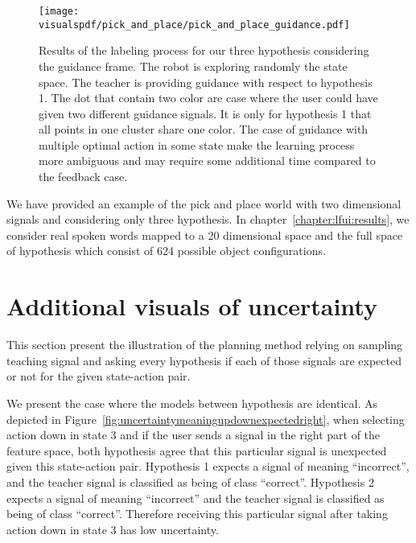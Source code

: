 \begin{figure}[!ht]
  \centering
  \texttt{[image: \\visualspdf/pick\_and\_place/pick\_and\_place\_guidance.pdf]}
  \caption{Results of the labeling process for our three hypothesis considering the guidance frame. The robot is exploring randomly the state space. The teacher is providing guidance with respect to hypothesis 1. The dot that contain two color are case where the user could have given two different guidance signals. It is only for hypothesis 1 that all points in one cluster share one color. The case of guidance with multiple optimal action in some state make the learning process more ambiguous and may require some additional time compared to the feedback case.}
  \label{fig:lfui:pickplaceguidance}
\end{figure}

We have provided an example of the pick and place world with two dimensional signals and considering only three hypothesis. In chapter~\ref{chapter:lfui:results}, we consider real spoken words mapped to a 20 dimensional space and the full space of hypothesis which consist of 624 possible object configurations.

\section{Additional visuals of uncertainty}
\label{appendix:uncertaintymeaning}

This section present the illustration of the planning method relying on sampling teaching signal and  asking every hypothesis if each of those signals are expected or not for the given state-action pair. 

We present the case where the models between hypothesis are identical. As depicted in Figure~\ref{fig:uncertaintymeaningupdownexpectedright}, when selecting action down in state 3 and if the user sends a signal in the right part of the feature space, both hypothesis agree that this particular signal is unexpected given this state-action pair. Hypothesis 1 expects a signal of meaning ``incorrect'', and the teacher signal is classified as being of class ``correct''. Hypothesis 2 expects a signal of meaning ``incorrect'' and the teacher signal is classified as being of class ``correct''. Therefore receiving this particular signal after taking action down in state 3 has low uncertainty.


